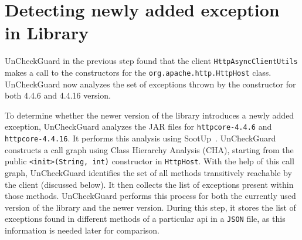
\section{Detecting newly added exception in Library} 

UnCheckGuard in the previous step found that the client \texttt{HttpAsyncClientUtils} makes a call to the constructors for the \texttt{org.apache.http.HttpHost} class. UnCheckGuard now analyzes the set of exceptions thrown by the constructor for both 4.4.6 and 4.4.16 version.

To determine whether the newer version of the library introduces a newly added exception, UnCheckGuard analyzes the JAR files for \texttt{httpcore-4.4.6} and \texttt{httpcore-4.4.16}. It performs this analysis using SootUp~\cite{Karakaya24:_sootup}. UnCheckGuard constructs a call graph using Class Hierarchy Analysis (CHA), starting from the public \texttt{<init>(String, int)} constructor in \texttt{HttpHost}. With the help of this call graph, UnCheckGuard identifies the set of all methods transitively reachable by the client (discussed below). It then collects the list of exceptions present within those methods. UnCheckGuard performs this process for both the currently used version of the library and the newer version. During this step, it stores the list of exceptions found in different methods of a particular \gls{api} in a \texttt{JSON} file, as this information is needed later for comparison.

